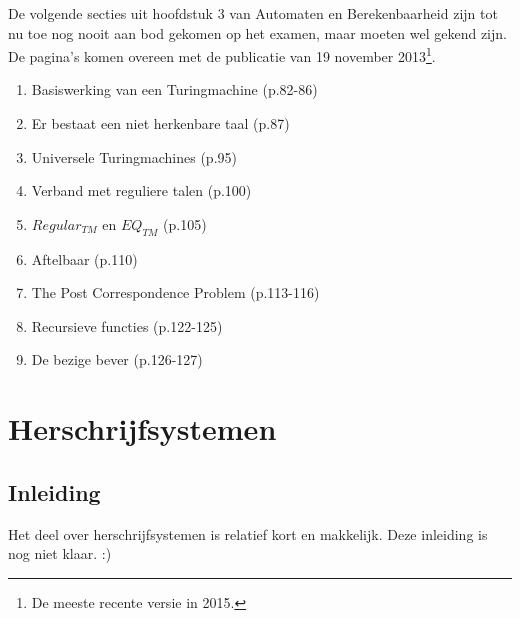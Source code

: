 \documentclass[10pt,a4paper]{article}
\begin{document}
De volgende secties uit hoofdstuk 3 van Automaten en Berekenbaarheid zijn tot nu toe nog nooit aan bod gekomen op het examen, maar moeten wel gekend zijn. De pagina's komen overeen met de publicatie van 19 november 2013\footnote{De meeste recente versie in 2015.}.
\begin{enumerate}
	\item Basiswerking van een Turingmachine (p.82-86)
	\item Er bestaat een niet herkenbare taal (p.87)
	\item Universele Turingmachines (p.95)
	\item Verband met reguliere talen (p.100)
	\item $Regular_{TM}$ en $EQ_{TM}$ (p.105)
	\item Aftelbaar (p.110)
	\item The Post Correspondence Problem (p.113-116)
	\item Recursieve functies (p.122-125)
	\item De bezige bever (p.126-127)
\end{enumerate}









\newpage
\section{Herschrijfsystemen}

\subsection{Inleiding}

Het deel over herschrijfsystemen is relatief kort en makkelijk. Deze inleiding is nog niet klaar. :)



\end{document}
